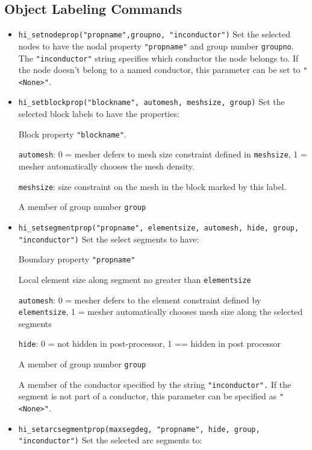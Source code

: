 \subsection{Object Labeling Commands}

\begin{itemize}
\item {\tt hi\_setnodeprop("propname",groupno, "inconductor")} Set the selected
nodes to have the nodal property \texttt{"propname"} and group
number \texttt{groupno}. The \texttt{"inconductor"} string
specifies which conductor the node belongs to. If the node doesn't
belong to a named conductor, this parameter can be set to
\texttt{"<None>"}.

\item {\tt hi\_setblockprop("blockname", automesh, meshsize, group)} Set the
selected block labels to have the properties:

Block property \texttt{"blockname"}.

\texttt{automesh}: 0 = mesher defers to mesh size constraint defined in
\texttt{meshsize}, 1 = mesher automatically chooses the mesh density.

\texttt{meshsize}: size constraint on the mesh in the block marked by this
label.

A member of group number \texttt{group}

\item {\tt hi\_setsegmentprop("propname", elementsize, automesh, hide, group,
"inconductor")} Set the select segments to have:

Boundary property \texttt{"propname"}

Local element size along segment no greater than
\texttt{elementsize}

\texttt{automesh}: 0 = mesher defers to the element constraint defined by
\texttt{elementsize}, 1 = mesher automatically chooses mesh size along the
selected segments

\texttt{hide}: 0 = not hidden in post-processor, 1 == hidden in post
processor

A member of group number \texttt{group}

A member of the conductor specified by the string
\texttt{"inconductor".} If the segment is not part of a conductor,
this parameter can be specified as
\texttt{"<None>"}.

\item {\tt hi\_setarcsegmentprop(maxsegdeg, "propname", hide, group,
"inconductor")} Set the selected arc segments to:


\end{itemize}
